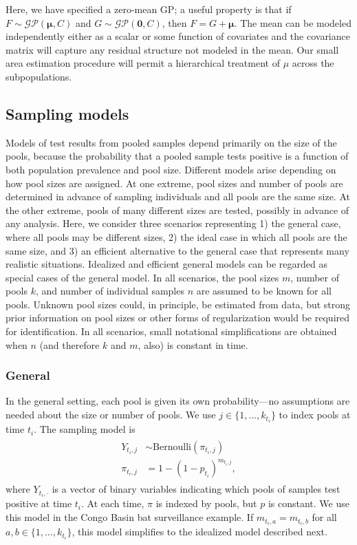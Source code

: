 \documentclass{article}
\begin{document}
Here, we have specified a zero-mean GP; a useful property is that if $F\sim \mathcal{GP}(\boldsymbol{\mu}, C)$ and $G\sim \mathcal{GP}(\boldsymbol{0}, C)$, then $F = G + \boldsymbol{\mu}$. The mean can be modeled independently either as a scalar or some function of covariates and the covariance matrix will capture any residual structure not modeled in the mean. Our small area estimation procedure will permit a hierarchical treatment of $\mu$ across the subpopulations.

\subsection{Sampling models}

Models of test results from pooled samples depend primarily on the size of the pools, because the probability that a pooled sample tests positive is a function of both population prevalence and pool size. Different models arise depending on how pool sizes are assigned. At one extreme, pool sizes and number of pools are determined in advance of sampling individuals and all pools are the same size. At the other extreme, pools of many different sizes are tested, possibly in advance of any analysis. Here, we consider three scenarios representing 1) the general case, where all pools may be different sizes, 2) the ideal case in which all pools are the same size, and 3) an efficient alternative to the general case that represents many realistic situations. Idealized and efficient general models can be regarded as special cases of the general model. In all scenarios, the pool sizes $m$, number of pools $k$, and number of individual samples $n$ are assumed to be known for all pools. Unknown pool sizes could, in principle, be estimated from data, but strong prior information on pool sizes or other forms of regularization would be required for identification. In all scenarios, small notational simplifications are obtained when $n$ (and therefore $k$ and $m$, also) is constant in time.

\subsubsection{General}

In the general setting, each pool is given its own probability—no assumptions are needed about the size or number of pools. We use $j\in \{1,\dots,k_{t_i}\}$ to index pools at time $t_i$. The sampling model is
\begin{align}
    \begin{split}
        Y_{t_i, j} &\sim \text{Bernoulli}(\pi_{t_i,j}) \\
        \pi_{t_i,j} &= 1- (1-p_{t_i})^{m_{t_i,j}},
    \end{split}
\end{align}
where $Y_{t_i,\cdot}$ is a vector of binary variables indicating which pools of samples test positive at time $t_i$. At each time, $\pi$ is indexed by pools, but $p$ is constant. We use this model in the Congo Basin bat surveillance example. If $m_{t_i,a} = m_{t_i,b}$ for all $a,b\in \{1,\dots,k_{t_i}\}$, this model simplifies to the idealized model described next. 
\end{document}

